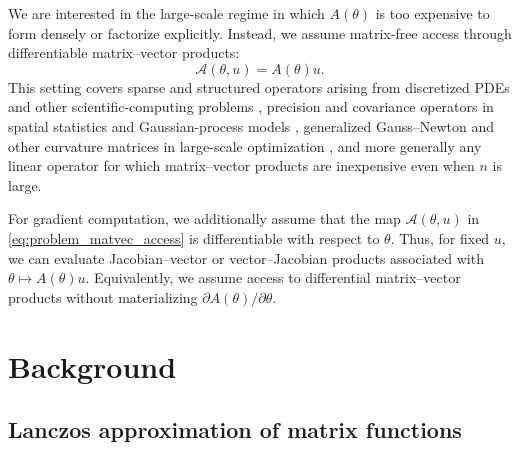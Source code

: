 \documentclass{article}
\begin{document}
We are interested in the large-scale regime in which $A(\theta)$ is too expensive to
form densely or factorize explicitly. Instead, we assume matrix-free access through
differentiable matrix--vector products:
\begin{equation}
    \mathcal{A}(\theta,u) = A(\theta)u .
    \label{eq:problem_matvec_access}
\end{equation}
This setting covers sparse and structured operators arising from discretized PDEs and
other scientific-computing problems \citep{saad2003iterative,elman2014finite},
precision and covariance operators in spatial statistics and Gaussian-process models
\citep{rue2005gaussian,rasmussen2006gaussian}, generalized Gauss--Newton and other
curvature matrices in large-scale optimization \citep{schraudolph2002fast,martens2010deep},
and more generally any linear operator for which matrix--vector products are inexpensive
even when $n$ is large.

For gradient computation, we additionally assume that the map
$\mathcal{A}(\theta,u)$ in \eqref{eq:problem_matvec_access} is differentiable with
respect to $\theta$. Thus, for fixed $u$, we can evaluate Jacobian--vector or
vector--Jacobian products associated with $\theta\mapsto A(\theta)u$. Equivalently, we
assume access to differential matrix--vector products without materializing
$\partial A(\theta)/\partial\theta$.

\section{Background}
\label{sec:background}
\subsection{Lanczos approximation of matrix functions}
\label{subsec:bg_lanczos}
\end{document}
